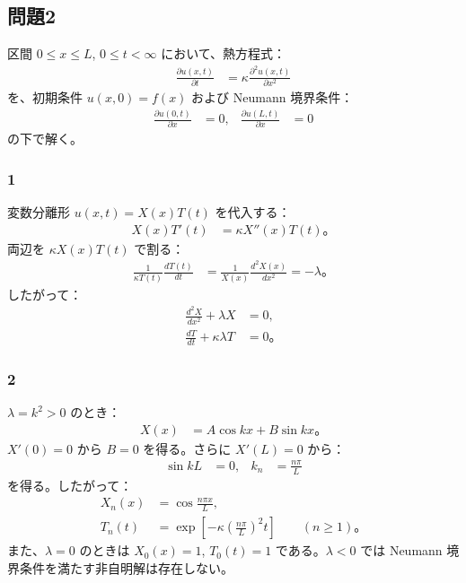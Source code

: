 \documentclass[platex,dvipdfmx,a4paper]{jsarticle}
\newcommand{\hb}[2]{\frac{\partial #1}{\partial #2}}
\newcommand{\bbn}[2]{\frac{d #1}{d #2}}
\newcommand{\nhb}[3]{\frac{\partial^{#1} #2}{\partial #3^{#1}}}
\newcommand{\nbbn}[3]{\frac{d^{#1} #2}{d #3^{#1}}}
\begin{document}
\subsection*{問題2}

区間 $0\leq x\leq L$, $0\leq t<\infty$ において、熱方程式：
\begin{align*}
  \hb{u(x,t)}{t}
  &=\kappa\nhb{2}{u(x,t)}{x}
\end{align*}
を、初期条件 $u(x,0)=f(x)$ および Neumann 境界条件：
\begin{align*}
  \hb{u(0,t)}{x}&=0,
  &\hb{u(L,t)}{x}&=0
\end{align*}
の下で解く。

\subsubsection*{1}

変数分離形 $u(x,t)=X(x)T(t)$ を代入する：
\begin{align*}
  X(x)T'(t)
  &=\kappa X''(x)T(t)。
\end{align*}
両辺を $\kappa X(x)T(t)$ で割る：
\begin{align*}
  \frac{1}{\kappa T(t)}\bbn{T(t)}{t}
  &=\frac{1}{X(x)}\nbbn{2}{X(x)}{x}
   =-\lambda。
\end{align*}
したがって：
\begin{align*}
  \nbbn{2}{X}{x}+\lambda X&=0,\\
  \bbn{T}{t}+\kappa\lambda T&=0。
\end{align*}

\subsubsection*{2}

$\lambda=k^2>0$ のとき：
\begin{align*}
  X(x)&=A\cos kx+B\sin kx。
\end{align*}
$X'(0)=0$ から $B=0$ を得る。さらに $X'(L)=0$ から：
\begin{align*}
  \sin kL&=0,
  &k_n&=\frac{n\pi}{L}
\end{align*}
を得る。したがって：
\begin{align*}
  X_n(x)&=\cos\frac{n\pi x}{L},\\
  T_n(t)&=\exp\left[-\kappa\left(\frac{n\pi}{L}\right)^2t\right]
  \qquad (n\geq1)。
\end{align*}
また、$\lambda=0$ のときは $X_0(x)=1$, $T_0(t)=1$ である。$\lambda<0$ では Neumann 境界条件を満たす非自明解は存在しない。
\end{document}
